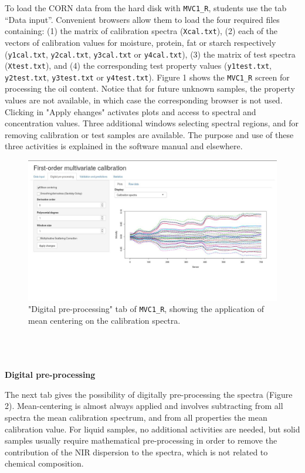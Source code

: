 \documentclass[10pt,twocolumn]{article}
\begin{document}
To load the CORN data from the hard disk with \texttt{MVC1\_R}, students use
the tab “Data input”. Convenient browsers allow them to load the four required
files containing: (1) the matrix of calibration spectra (\texttt{Xcal.txt}),
(2) each of the vectors of calibration values for moisture, protein, fat or
starch respectively (\texttt{y1cal.txt}, \texttt{y2cal.txt}, \texttt{y3cal.txt}
or \texttt{y4cal.txt}), (3) the matrix of test spectra (\texttt{Xtest.txt}),
and (4) the corresponding test property values (\texttt{y1test.txt},
\texttt{y2test.txt}, \texttt{y3test.txt} or \texttt{y4test.txt}). Figure 1
shows the \texttt{MVC1\_R} screen for processing the oil content. Notice that
for future unknown samples, the property values are not available, in which
case the corresponding browser is not used. Clicking in "Apply ehanges"
activates plots and access to spectral and concentration values. Three
additional windows selecting spectral regions, and for removing calibration or
test samples are available. The purpose and use of these three activities is
explained in the software manual and elsewhere.\cite{olivieri18}
\begin{figure}
	\includegraphics[width=\linewidth]{figure2.jpg}
	\caption{"Digital pre-processing" tab of \texttt{MVC1\_R}, showing the
	application of mean centering on the calibration spectra.}
	\label{fig:2}
\end{figure}
\\ \\ \\
\textbf{Digital pre-processing}

The next tab gives the possibility of digitally pre-processing the spectra
(Figure 2). Mean-centering is almost always applied and involves subtracting
from all spectra the mean calibration spectrum, and from all properties the mean
calibration value. For liquid samples, no additional activities are needed, but
solid samples usually require mathematical pre-processing in order to remove the
contribution of the NIR dispersion to the spectra, which is not related to
chemical composition. 
\end{document}
